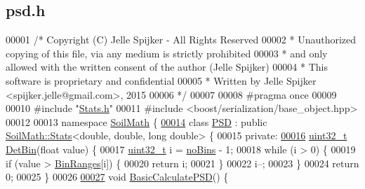 \hypertarget{psd_8h_source}{}\subsection{psd.\+h}
\label{psd_8h_source}

\begin{DoxyCode}
00001 \textcolor{comment}{/* Copyright (C) Jelle Spijker - All Rights Reserved}
00002 \textcolor{comment}{ * Unauthorized copying of this file, via any medium is strictly prohibited}
00003 \textcolor{comment}{ * and only allowed with the written consent of the author (Jelle Spijker)}
00004 \textcolor{comment}{ * This software is proprietary and confidential}
00005 \textcolor{comment}{ * Written by Jelle Spijker <spijker.jelle@gmail.com>, 2015}
00006 \textcolor{comment}{ */}
00007 
00008 \textcolor{preprocessor}{#pragma once}
00009 
00010 \textcolor{preprocessor}{#include "\hyperlink{_stats_8h}{Stats.h}"}
00011 \textcolor{preprocessor}{#include <boost/serialization/base\_object.hpp>}
00012 
00013 \textcolor{keyword}{namespace }\hyperlink{namespace_soil_math}{SoilMath} \{
\hypertarget{psd_8h_source_l00014}{}\hyperlink{class_soil_math_1_1_p_s_d}{00014} \textcolor{keyword}{class }\hyperlink{class_soil_math_1_1_p_s_d}{PSD} : \textcolor{keyword}{public} \hyperlink{class_soil_math_1_1_stats}{SoilMath::Stats}<double, double, long double> \{
00015 \textcolor{keyword}{private}:
\hypertarget{psd_8h_source_l00016}{}\hyperlink{class_soil_math_1_1_p_s_d_adec9cd4f565f8edb2bc2c91d5d53e584}{00016}   \hyperlink{_soil_math_types_8h_a435d1572bf3f880d55459d9805097f62}{uint32\_t} \hyperlink{class_soil_math_1_1_p_s_d_adec9cd4f565f8edb2bc2c91d5d53e584}{DetBin}(\textcolor{keywordtype}{float} value) \{
00017     \hyperlink{_soil_math_types_8h_a435d1572bf3f880d55459d9805097f62}{uint32\_t} i = \hyperlink{class_soil_math_1_1_stats_a4202c9085eacaff2e04eda84fc90e92b}{noBins} - 1;
00018     \textcolor{keywordflow}{while} (i > 0) \{
00019       \textcolor{keywordflow}{if} (value > \hyperlink{class_soil_math_1_1_stats_a0d452c96b6f499f054432bd3b52d1302}{BinRanges}[i]) \{
00020         \textcolor{keywordflow}{return} i;
00021       \}
00022       i--;
00023     \}
00024     \textcolor{keywordflow}{return} 0;
00025   \}
00026 
\hypertarget{psd_8h_source_l00027}{}\hyperlink{class_soil_math_1_1_p_s_d_aa8809250300c581de1e67118156c5255}{00027}   \textcolor{keywordtype}{void} \hyperlink{class_soil_math_1_1_p_s_d_aa8809250300c581de1e67118156c5255}{BasicCalculatePSD}() \{

\end{DoxyCode}
